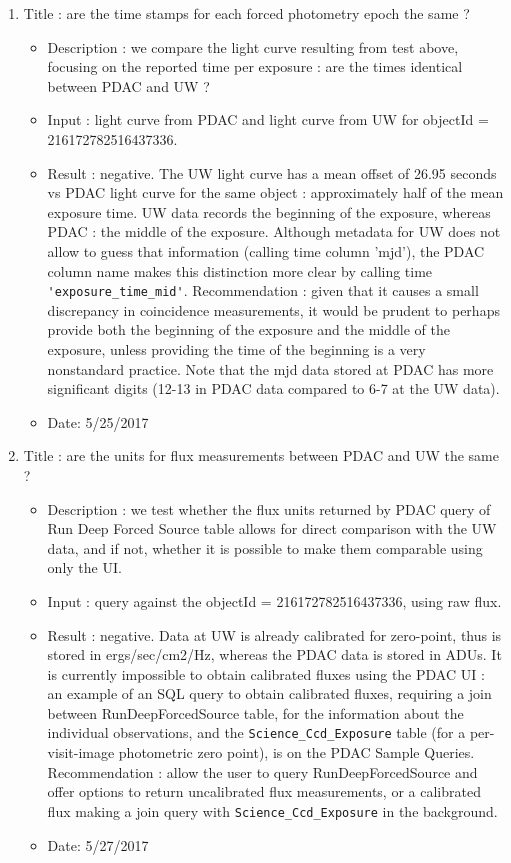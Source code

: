 \documentclass[DM,lsstdraft,toc]{lsstdoc}
\begin{document}
\begin{enumerate}
      \item Title : are the time stamps for each forced photometry epoch the same ?
    \begin{itemize}
      \item Description : we compare the light curve resulting from test above, focusing on the reported time per exposure : are the times identical between PDAC and  UW ?
      \item Input : light curve from PDAC and light curve from UW for objectId = 216172782516437336.
      \item Result : negative. The UW light curve has a mean offset of 26.95 seconds vs PDAC light curve for the same object : approximately half of the mean exposure time. UW data records the beginning of the exposure, whereas PDAC  : the middle of the exposure. Although metadata for UW does not allow to guess that information (calling time column 'mjd'), the PDAC column name makes this distinction more clear by calling time \verb|'exposure_time_mid'|. Recommendation : given that it causes  a small discrepancy in coincidence measurements, it would be prudent to perhaps provide both the beginning of the exposure and the middle of the exposure, unless providing the time of the beginning is a very nonstandard practice. Note that the mjd data stored at PDAC has more significant digits (12-13 in PDAC data compared to 6-7 at the UW data).
      \item Date: 5/25/2017
    \end{itemize}

      \item Title : are the units for  flux measurements between PDAC and UW the same ?
    \begin{itemize}
      \item Description : we test whether the flux units  returned by PDAC query of Run Deep Forced Source table allows for direct comparison with the UW data, and if not, whether it is possible to make them comparable using only the UI.
      \item Input : query against the objectId = 216172782516437336, using raw flux.
      \item Result : negative. Data at UW is already calibrated for zero-point, thus is stored in ergs/sec/cm2/Hz, whereas the PDAC data is stored in ADUs.  It is currently impossible to obtain calibrated fluxes using the PDAC UI : an example of an SQL query to obtain calibrated fluxes, requiring a join between RunDeepForcedSource table, for the information about the individual observations, and the \verb|Science_Ccd_Exposure| table (for a per-visit-image  photometric zero point), is on the PDAC Sample Queries. Recommendation : allow the user to query RunDeepForcedSource and offer options to return uncalibrated flux measurements, or a calibrated flux making a join query with \verb|Science_Ccd_Exposure|  in the background.
      \item Date: 5/27/2017
    \end{itemize}



\end{enumerate}
\end{document}
